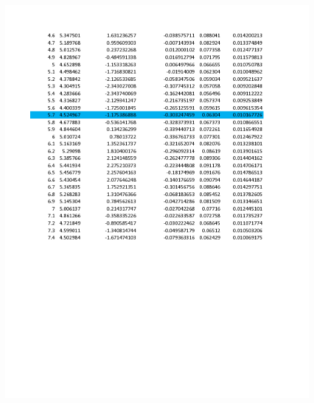 \documentclass{article}
\begin{document}
\begin{minipage}{0.5\linewidth}
	\includegraphics[width = \textwidth]{glider_trajectory-1.png}
\end{minipage}
\end{document}
